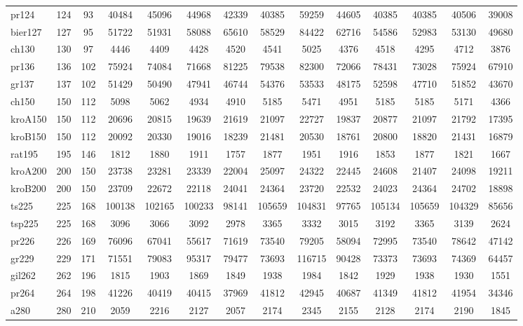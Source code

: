 \documentclass[conference]{IEEEtran}
\begin{document}
\begin{table}[htbp]
{{\begin{tabular}{|l|c|c|c|c|c|c|c|c|c|c|c|c|c|}
pr124 & 124 & 93 & 40484 & 45096 & 44968 & 42339 & 40385 & 59259 & 44605 & 40385 & 40385 & 40506 & 39008 \\
bier127 & 127 & 95 & 51722 & 51931 & 58088 & 65610 & 58529 & 84422 & 62716 & 54586 & 52983 & 53130 & 49680 \\
ch130 & 130 & 97 & 4446 & 4409 & 4428 & 4520 & 4541 & 5025 & 4376 & 4518 & 4295 & 4712 & 3876 \\
pr136 & 136 & 102 & 75924 & 74084 & 71668 & 81225 & 79538 & 82300 & 72066 & 78431 & 73028 & 75924 & 67910 \\
gr137 & 137 & 102 & 51429 & 50490 & 47941 & 46744 & 54376 & 53533 & 48175 & 52598 & 47710 & 51852 & 43670 \\
ch150 & 150 & 112 & 5098 & 5062 & 4934 & 4910 & 5185 & 5471 & 4951 & 5185 & 5185 & 5171 & 4366 \\
kroA150 & 150 & 112 & 20696 & 20815 & 19639 & 21619 & 21097 & 22727 & 19837 & 20877 & 21097 & 21792 & 17395 \\
kroB150 & 150 & 112 & 20092 & 20330 & 19016 & 18239 & 21481 & 20530 & 18761 & 20800 & 18820 & 21431 & 16879 \\
rat195 & 195 & 146 & 1812 & 1880 & 1911 & 1757 & 1877 & 1951 & 1916 & 1853 & 1877 & 1821 & 1667 \\
kroA200 & 200 & 150 & 23738 & 23281 & 23339 & 22004 & 25097 & 24322 & 22445 & 24608 & 21407 & 24098 & 19211 \\
kroB200 & 200 & 150 & 23709 & 22672 & 22118 & 24041 & 24364 & 23720 & 22532 & 24023 & 24364 & 24702 & 18898 \\
ts225 & 225 & 168 & 100138 & 102165 & 100233 & 98141 & 105659 & 104831 & 97765 & 105134 & 105659 & 104329 & 85656 \\
tsp225 & 225 & 168 & 3096 & 3066 & 3092 & 2978 & 3365 & 3332 & 3015 & 3192 & 3365 & 3139 & 2624 \\
pr226 & 226 & 169 & 76096 & 67041 & 55617 & 71619 & 73540 & 79205 & 58094 & 72995 & 73540 & 78642 & 47142 \\
gr229 & 229 & 171 & 71551 & 79083 & 95317 & 79477 & 73693 & 116715 & 90428 & 73373 & 73693 & 74369 & 64457 \\
gil262 & 262 & 196 & 1815 & 1903 & 1869 & 1849 & 1938 & 1984 & 1842 & 1929 & 1938 & 1930 & 1551 \\
pr264 & 264 & 198 & 41226 & 40419 & 40415 & 37969 & 41812 & 42945 & 40687 & 41349 & 41812 & 41954 & 34346 \\
a280 & 280 & 210 & 2059 & 2216 & 2127 & 2057 & 2174 & 2345 & 2155 & 2128 & 2174 & 2190 & 1845 \\

\end{tabular}}}
\end{table}
\end{document}
